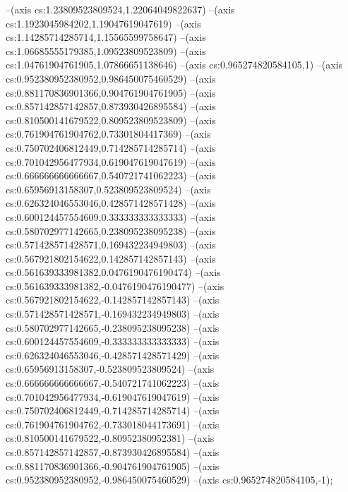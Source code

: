 --(axis cs:1.23809523809524,1.22064049822637)
--(axis cs:1.1923045984202,1.19047619047619)
--(axis cs:1.14285714285714,1.15565599758647)
--(axis cs:1.06685555179385,1.09523809523809)
--(axis cs:1.04761904761905,1.07866651138646)
--(axis cs:0.965274820584105,1)
--(axis cs:0.952380952380952,0.986450075460529)
--(axis cs:0.881170836901366,0.904761904761905)
--(axis cs:0.857142857142857,0.873930426895584)
--(axis cs:0.810500141679522,0.809523809523809)
--(axis cs:0.761904761904762,0.73301804417369)
--(axis cs:0.750702406812449,0.714285714285714)
--(axis cs:0.701042956477934,0.619047619047619)
--(axis cs:0.666666666666667,0.540721741062223)
--(axis cs:0.65956913158307,0.523809523809524)
--(axis cs:0.626324046553046,0.428571428571428)
--(axis cs:0.600124457554609,0.333333333333333)
--(axis cs:0.580702977142665,0.238095238095238)
--(axis cs:0.571428571428571,0.169432234949803)
--(axis cs:0.567921802154622,0.142857142857143)
--(axis cs:0.561639333981382,0.0476190476190474)
--(axis cs:0.561639333981382,-0.0476190476190477)
--(axis cs:0.567921802154622,-0.142857142857143)
--(axis cs:0.571428571428571,-0.169432234949803)
--(axis cs:0.580702977142665,-0.238095238095238)
--(axis cs:0.600124457554609,-0.333333333333333)
--(axis cs:0.626324046553046,-0.428571428571429)
--(axis cs:0.65956913158307,-0.523809523809524)
--(axis cs:0.666666666666667,-0.540721741062223)
--(axis cs:0.701042956477934,-0.619047619047619)
--(axis cs:0.750702406812449,-0.714285714285714)
--(axis cs:0.761904761904762,-0.733018044173691)
--(axis cs:0.810500141679522,-0.80952380952381)
--(axis cs:0.857142857142857,-0.873930426895584)
--(axis cs:0.881170836901366,-0.904761904761905)
--(axis cs:0.952380952380952,-0.986450075460529)
--(axis cs:0.965274820584105,-1);

